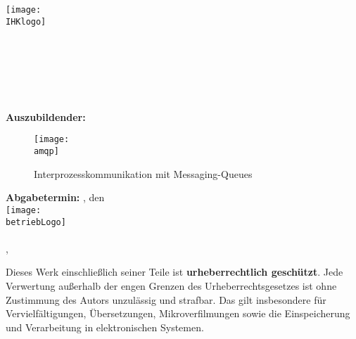 \begin{titlepage}

\begin{center}
\texttt{[image: \\IHKlogo]}\\[0.5ex]
\Large{\ausbildungsberuf}\\
\LARGE{\betreff}\\
\huge{\textbf{\titelOne\\\titelTwo}}\\[0.5ex]
\Large{\textbf{\untertitelOne}}\\
\Large{\textbf{\untertitelTwo}}\\[1.5ex]

\normalsize
\textbf{Auszubildender:} \autorName\\[2.5ex]

\begin{figure}[htb]
    \centering
    \texttt{[image: \\amqp]}\\[1ex]
    \caption{Interprozesskommunikation mit Messaging-Queues}
    \label{fig:redHatCom}
\end{figure}

\textbf{Abgabetermin:} \abgabeOrt{}, den \abgabeTermin\\[3ex]

\texttt{[image: \\betriebLogo]}\\
\betriebName{}\\
\betriebAnschrift{}, \betriebOrt\\[2.5ex]
\end{center}

\small
\noindent
Dieses Werk einschließlich seiner Teile ist \textbf{urheberrechtlich geschützt}.
Jede Verwertung außerhalb der engen Grenzen des Urheberrechtsgesetzes ist ohne Zustimmung des Autors unzulässig und strafbar.
Das gilt insbesondere für Vervielfältigungen, Übersetzungen, Mikroverfilmungen sowie die Einspeicherung und Verarbeitung in elektronischen Systemen.

\end{titlepage}
